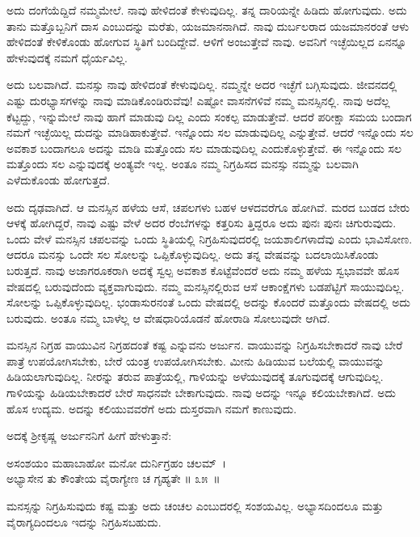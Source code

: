 ಅದು ದಂಗೆಯೆದ್ದಿದೆ ನಮ್ಮಮೇಲೆ. ನಾವು ಹೇಳಿದಂತೆ ಕೇಳುವುದಿಲ್ಲ. ತನ್ನ ದಾರಿಯನ್ನೇ ಹಿಡಿದು ಹೋಗುವುದು. ಅದು ತಾನು ಮತ್ತೊಬ್ಬನಿಗೆ ದಾಸ ಎಂಬುದನ್ನು ಮರೆತು, ಯಜಮಾನನಾಗಿದೆ. ನಾವು ದುರ್ಬಲರಾದ ಯಜಮಾನರಂತೆ ಆಳು ಹೇಳಿದಂತೆ ಕೇಳಿಕೊಂಡು ಹೋಗುವ ಸ್ಥಿತಿಗೆ ಬಂದಿದ್ದೇವೆ. ಆಳಿಗೆ ಅಂಜುತ್ತೇವೆ ನಾವು. ಅವನಿಗೆ ಇಚ್ಛೆಯಿಲ್ಲದ ಏನನ್ನೂ ಹೇಳುವುದಕ್ಕೆ ನಮಗೆ ಧೈರ್ಯವಿಲ್ಲ.

ಅದು ಬಲವಾಗಿದೆ. ಮನಸ್ಸು ನಾವು ಹೇಳಿದಂತೆ ಕೇಳುವುದಿಲ್ಲ. ನಮ್ಮನ್ನೇ ಅದರ ಇಚ್ಛೆಗೆ ಬಗ್ಗಿಸುವುದು. ಜೀವನದಲ್ಲಿ ಎಷ್ಟು ದುರಭ್ಯಾಸಗಳನ್ನು ನಾವು ಮಾಡಿಕೊಂಡಿರುವೆವು! ಎಷ್ಟೋ ವಾಸನೆಗಳಿವೆ ನಮ್ಮ ಮನಸ್ಸಿನಲ್ಲಿ. ನಾವು ಅದೆಲ್ಲ ಕೆಟ್ಟದ್ದು, ಇನ್ನುಮೇಲೆ ನಾವು ಹಾಗೆ ಮಾಡುವು ದಿಲ್ಲ ಎಂದು ಸಂಕಲ್ಪ ಮಾಡುತ್ತೇವೆ. ಆದರೆ ಪರೀಕ್ಷಾ ಸಮಯ ಬಂದಾಗ ನಮಗೆ ಇಚ್ಛೆಯಿಲ್ಲ ದುದನ್ನು ಮಾಡಿಹಾಕುತ್ತೇವೆ. ಇನ್ನೊಂದು ಸಲ ಮಾಡುವುದಿಲ್ಲ ಎನ್ನುತ್ತೇವೆ. ಆದರೆ ಇನ್ನೊಂದು ಸಲ ಅವಕಾಶ ಬಂದಾಗಲೂ ಅದನ್ನು ಮಾಡಿ ಮತ್ತೊಂದು ಸಲ ಮಾಡುವುದಿಲ್ಲ ಎಂದುಕೊಳ್ಳುತ್ತೇವೆ. ಈ ಇನ್ನೊಂದು ಸಲ ಮತ್ತೊಂದು ಸಲ ಎನ್ನುವುದಕ್ಕೆ ಅಂತ್ಯವೇ ಇಲ್ಲ. ಅಂತೂ ನಮ್ಮ ನಿಗ್ರಹಿಸದ ಮನಸ್ಸು ನಮ್ಮನ್ನು ಬಲವಾಗಿ ಎಳೆದುಕೊಂಡು ಹೋಗುತ್ತದೆ.

ಅದು ದೃಢವಾಗಿದೆ. ಆ ಮನಸ್ಸಿನ ಹಳೆಯ ಆಸೆ, ಚಪಲಗಳು ಬಹಳ ಆಳದವರೆಗೂ ಹೋಗಿವೆ. ಮರದ ಬುಡದ ಬೇರು ಆಳಕ್ಕೆ ಹೋಗಿದ್ದರೆ, ನಾವು ಎಷ್ಟು ವೇಳೆ ಅದರ ರೆಂಬೆಗಳನ್ನು ಕತ್ತರಿಸು ತ್ತಿದ್ದರೂ ಅದು ಪುನಃ ಪುನಃ ಚಿಗುರುವುದು. ಒಂದು ವೇಳೆ ಮನಸ್ಸಿನ ಚಪಲವನ್ನು ಒಂದು ಸ್ಥಿತಿಯಲ್ಲಿ ನಿಗ್ರಹಿಸುವುದರಲ್ಲಿ ಜಯಶಾಲಿಗಳಾದೆವು ಎಂದು ಭಾವಿಸೋಣ. ಆದರೂ ಮನಸ್ಸು ಒಂದೇ ಸಲ ಸೋಲನ್ನು ಒಪ್ಪಿಕೊಳ್ಳುವುದಿಲ್ಲ. ಅದು ತನ್ನ ವೇಷವನ್ನು ಬದಲಾಯಿಸಿಕೊಂಡು ಬರುತ್ತದೆ. ನಾವು ಅಜಾಗರೂಕರಾಗಿ ಅದಕ್ಕೆ ಸ್ವಲ್ಪ ಅವಕಾಶ ಕೊಟ್ಟೆವೆಂದರೆ ಅದು ನಮ್ಮ ಹಳೆಯ ಸ್ವಭಾವವೇ ಹೊಸ ವೇಷದಲ್ಲಿ ಬರುವುದೆಂದು ವ್ಯಕ್ತವಾಗುವುದು. ನಮ್ಮ ಮನಸ್ಸಿನಲ್ಲಿರುವ ಆಸೆ ಆಕಾಂಕ್ಷೆಗಳು ಬಡಪೆಟ್ಟಿಗೆ ಸಾಯುವುದಿಲ್ಲ. ಸೋಲನ್ನು ಒಪ್ಪಿಕೊಳ್ಳುವುದಿಲ್ಲ. ಭಂಡಾಸುರನಂತೆ ಒಂದು ವೇಷದಲ್ಲಿ ಅದನ್ನು ಕೊಂದರೆ ಮತ್ತೊಂದು ವೇಷದಲ್ಲಿ ಅದು ಬರುವುದು. ಅಂತೂ ನಮ್ಮ ಬಾಳೆಲ್ಲ ಆ ವೇಷಧಾರಿಯೊಡನೆ ಹೋರಾಡಿ ಸೋಲುವುದೇ ಆಗಿದೆ.

ಮನಸ್ಸಿನ ನಿಗ್ರಹ ವಾಯುವಿನ ನಿಗ್ರಹದಂತೆ ಕಷ್ಟ ಎನ್ನುವನು ಅರ್ಜುನ. ವಾಯುವನ್ನು ನಿಗ್ರಹಿಸಬೇಕಾದರೆ ನಾವು ಬೇರೆ ಪಾತ್ರೆ ಉಪಯೋಗಿಸಬೇಕು, ಬೇರೆ ಯಂತ್ರ ಉಪಯೋಗಿಸಬೇಕು. ಮೀನು ಹಿಡಿಯುವ ಬಲೆಯಲ್ಲಿ ವಾಯುವನ್ನು ಹಿಡಿಯಲಾಗುವುದಿಲ್ಲ. ನೀರನ್ನು ತರುವ ಪಾತ್ರೆಯಲ್ಲಿ, ಗಾಳಿಯನ್ನು ಅಳೆಯುವುದಕ್ಕೆ ತೂಗುವುದಕ್ಕೆ ಆಗುವುದಿಲ್ಲ. ಗಾಳಿಯನ್ನು ಹಿಡಿಯಬೇಕಾದರೆ ಬೇರೆ ಸಾಧನವೇ ಬೇಕಾಗುವುದು. ನಾವು ಅದನ್ನು ಇನ್ನೂ ಕಲಿಯಬೇಕಾಗಿದೆ. ಅದು ಹೊಸ ಉದ್ಯಮ. ಅದನ್ನು ಕಲಿಯುವವರೆಗೆ ಅದು ದುಸ್ತರವಾಗಿ ನಮಗೆ ಕಾಣುವುದು.

ಅದಕ್ಕೆ ಶ‍್ರೀಕೃಷ್ಣ ಅರ್ಜುನನಿಗೆ ಹೀಗೆ ಹೇಳುತ್ತಾನೆ:

\begin{shloka}
ಅಸಂಶಯಂ ಮಹಾಬಾಹೋ ಮನೋ ದುರ್ನಿಗ್ರಹಂ ಚಲಮ್~।\\ಅಭ್ಯಾಸೇನ ತು ಕೌಂತೇಯ ವೈರಾಗ್ಯೇಣ ಚ ಗೃಹ್ಯತೇ \hfill॥ ೩೫~॥
\end{shloka}

\begin{artha}
ಮನಸ್ಸನ್ನು ನಿಗ್ರಹಿಸುವುದು ಕಷ್ಟ ಮತ್ತು ಅದು ಚಂಚಲ ಎಂಬುದರಲ್ಲಿ ಸಂಶಯವಿಲ್ಲ. ಅಭ್ಯಾಸದಿಂದಲೂ ಮತ್ತು ವೈರಾಗ್ಯದಿಂದಲೂ ಇದನ್ನು ನಿಗ್ರಹಿಸಬಹುದು.
\end{artha}

